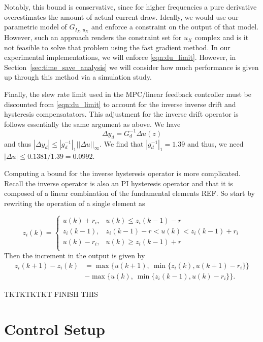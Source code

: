 \documentclass[journal,twocolumn,twoside]{IEEEtran}
\begin{document}
Notably, this bound is conservative, since for higher frequencies a pure derivative overestimates the amount of actual current draw. Ideally, we would use our parametric model of \(G_{I_{X},u_{X}}\) and enforce a constraint on the output of that model. However, such an approach renders the constraint set for $u_X$ complex and is it not feasible to solve that problem using the fast gradient method. In our experimental implementations, we will enforce \eqref{eqn:du_limit}. However, in Section~\ref{sec:time_save_analysis} we will consider how much performance is given up through this method via a simulation study. 

Finally, the slew rate limit used in the MPC/linear feedback controller must be discounted from \eqref{eqn:du_limit} to account for the inverse inverse drift and hysteresis compensatators. This adjustment for the inverse drift operator is follows essentially the same argument as above. We have
\begin{equation}
\Delta y_d = G_d^{-1} \Delta u(z)
\end{equation}
and thus $|\Delta y_d| \leq |g_d^{-1}|_1 ||\Delta u||_{\infty}$. We find that $|g_d^{-1}|_1  = 1.39$ and thus, we need $|\Delta u| \leq 0.1381/1.39 = 0.0992$.

Computing a bound for the inverse hysteresis operator is more complicated. Recall the inverse operator is also an PI hysteresis operator and that it is composed of a linear combination of the fundamental elements REF. So start by rewriting the operation of a single element as

\begin{equation}
  z_i(k)  = 
  \begin{cases}
    u(k) + r_i, & u(k) \leq z_i(k-1) -r\\
    z_i(k-1), & z_i(k-1) - r < u(k) < z_i(k-1) + r_i\\
    u(k) - r_i, & u(k) \geq z_i(k-1) +r\\
  \end{cases}
\end{equation}
Then the increment in the output is given by
\begin{align}
  z_i(k+1)- z_i(k) &= \max\{u(k+1),\: \min\{z_i(k), u(k+1) - r_i\}\}\\
  &- \max\{u(k),\: \min\{z_i(k-1), u(k) - r_i\}\}.
\end{align}

TKTKTKTKT FINISH THIS

\section{Control Setup}
\end{document}
